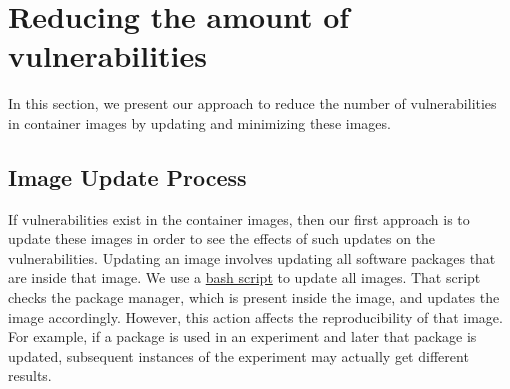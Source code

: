 \documentclass[a4paper,num-refs]{oup-contemporary}
\begin{document}





\section{Reducing the amount of vulnerabilities}

In this section, we present our approach to reduce the number of
vulnerabilities in container images  by updating and minimizing these
images.

\subsection{Image Update Process}

If vulnerabilities exist in the container images, then our first approach
is to update these images in order to see the effects of such updates
on the vulnerabilities.
Updating an image involves updating all software packages that are
inside that image. We use a 
\href{https://github.com/kaurbhupinder/Vulnerability-Analysis/blob/master/Scripts/update/update.sh}{bash script} 
to update all images. That script checks the
package manager, which is present inside the image, and updates the image
accordingly. However, this action affects the reproducibility
of that image. For example, if a package is used in an experiment
and later that package is updated, subsequent instances of the experiment may actually
get different results.
\end{document}
